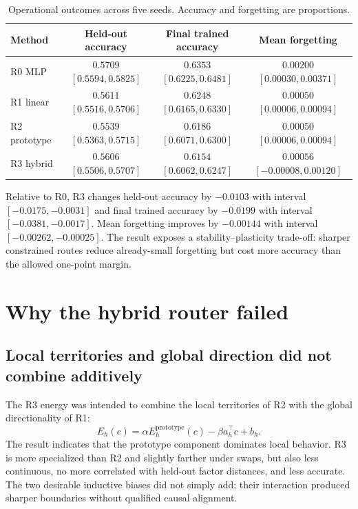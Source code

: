 \documentclass[11pt,a4paper]{article}
\begin{document}
\begin{table}[H]
\centering
\caption{Operational outcomes across five seeds. Accuracy and forgetting are proportions.}
\label{tab:operational}
\small
\begin{tabular}{@{}lccc@{}}
\toprule
Method & Held-out accuracy & Final trained accuracy & Mean forgetting \\
\midrule
R0 MLP & $0.5709$ $[0.5594,0.5825]$ & $0.6353$ $[0.6225,0.6481]$ & $0.00200$ $[0.00030,0.00371]$ \\
R1 linear & $0.5611$ $[0.5516,0.5706]$ & $0.6248$ $[0.6165,0.6330]$ & $0.00050$ $[0.00006,0.00094]$ \\
R2 prototype & $0.5539$ $[0.5363,0.5715]$ & $0.6186$ $[0.6071,0.6300]$ & $0.00050$ $[0.00006,0.00094]$ \\
R3 hybrid & $0.5606$ $[0.5506,0.5707]$ & $0.6154$ $[0.6062,0.6247]$ & $0.00056$ $[-0.00008,0.00120]$ \\
\bottomrule
\end{tabular}
\end{table}

Relative to R0, R3 changes held-out accuracy by $-0.0103$ with interval $[-0.0175,-0.0031]$ and final trained accuracy by $-0.0199$ with interval $[-0.0381,-0.0017]$. Mean forgetting improves by $-0.00144$ with interval $[-0.00262,-0.00025]$. The result exposes a stability--plasticity trade-off: sharper constrained routes reduce already-small forgetting but cost more accuracy than the allowed one-point margin.

\section{Why the hybrid router failed}
\subsection{Local territories and global direction did not combine additively}
The R3 energy was intended to combine the local territories of R2 with the global directionality of R1:
\begin{equation}
 E_h(c)=\alpha E_h^{\mathrm{prototype}}(c)-\beta a_h^\top c+b_h.
\end{equation}
The result indicates that the prototype component dominates local behavior. R3 is more specialized than R2 and slightly farther under swaps, but also less continuous, no more correlated with held-out factor distances, and less accurate. The two desirable inductive biases did not simply add; their interaction produced sharper boundaries without qualified causal alignment.
\end{document}
